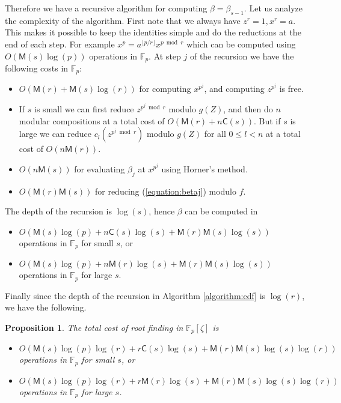 \documentclass[12pt]{article}
\theoremstyle{plain}
\newtheorem{proposition}[theorem]{Proposition}
\theoremstyle{definition}
\def\F{\ensuremath{\mathbb{F}}}
\def\MM{\ensuremath{\mathsf{M}}}
\def\CC{\ensuremath{\mathsf{C}}}
\newcounter{algorithm}
\begin{document}
Therefore we have a recursive algorithm for computing $\beta = \beta_{s - 1}$. Let us analyze the 
complexity of the algorithm. First note that we always have $z^r = 1, x^r = a$. This makes it 
possible to keep the identities simple and do the reductions at the end of each step. For example 
$x^p = a^{\lfloor p / r\rfloor}x^{p \bmod r}$ which can be computed using $O(\MM(s)\log(p))$
operations in $\F_p$. At step $j$ of the recursion we have the following costs in $\F_p$:
\begin{itemize}
	\item $O(\MM(r) + \MM(s)\log(r))$ for computing $x^{p^j}$, and computing $z^{p^j}$ is free.
	\item If $s$ is small we can first reduce $z^{p^j \bmod r}$ modulo $g(Z)$, and then do $n$ 
	modular compositions at a total cost
	of $O(\MM(r) + n\CC(s))$. But if $s$ is large we can reduce $c_l(z^{p^j \bmod r})$ modulo 
	$g(Z)$ for all $0 \le l < n$ at a total cost of $O(n\MM(r))$.
	\item $O(n\MM(s))$ for evaluating $\beta_j$ at $x^{p^j}$ using Horner's method.
	\item $O(\MM(r)\MM(s))$ for reducing (\ref{equation:betaj}) modulo $f$.
\end{itemize}
The depth of the recursion is $\log(s)$, hence $\beta$ can be computed in
\begin{itemize}
	\item $O(\MM(s)\log(p) + n\CC(s)\log(s) + \MM(r)\MM(s)\log(s))$ operations in $\F_p$ for small 
	$s$, or
	\item $O(\MM(s)\log(p) + n\MM(r)\log(s) + \MM(r)\MM(s)\log(s))$ operations in $\F_p$ for large 
	$s$.
\end{itemize} 
Finally since the depth of the recursion in Algorithm \ref{algorithm:edf} is $\log(r)$, we have the 
following.
\begin{proposition}
	\label{proposition:root-fpz}
	The total cost of root finding in $\F_p[\zeta]$ is
	\begin{itemize}
		\item $O(\MM(s)\log(p)\log(r) + r\CC(s)\log(s) + \MM(r)\MM(s)\log(s)\log(r))$\\ operations 
		in 
		$\F_p$ for small $s$, or
		\item $O(\MM(s)\log(p)\log(r) + r\MM(r)\log(s) + \MM(r)\MM(s)\log(s)\log(r))$\\ operations 
		in 
		$\F_p$ for large $s$.
	\end{itemize}
\end{proposition}
\end{document}
